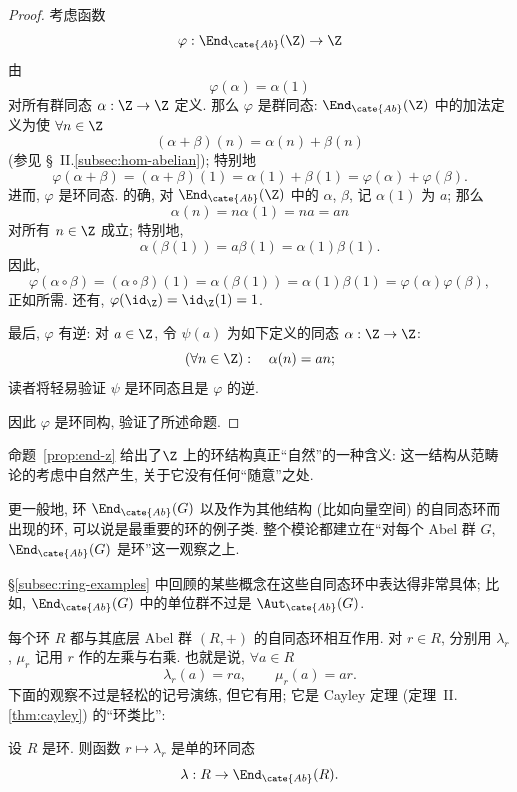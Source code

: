 \begin{proof}
考虑函数
\[
\varphi : \End_{\cate{Ab}}(\Z) \to \Z
\]
由
\[
\varphi(\alpha) = \alpha(1)
\]
对所有群同态 $\alpha : \Z \to \Z$ 定义. 那么 $\varphi$ 是群同态: $\End_{\cate{Ab}}(\Z)$ 中的加法定义为使 $\forall n \in \Z$
\[
(\alpha + \beta)(n) = \alpha(n) + \beta(n)
\]
(参见 \S~II.\ref{subsec:hom-abelian}); 特别地
\[
\varphi(\alpha + \beta) = (\alpha + \beta)(1) = \alpha(1) + \beta(1) = \varphi(\alpha) + \varphi(\beta).
\]
进而, $\varphi$ 是环同态. 的确, 对 $\End_{\cate{Ab}}(\Z)$ 中的 $\alpha$, $\beta$, 记 $\alpha(1)$ 为 $a$; 那么
\[
\alpha(n) = n\alpha(1) = na = an
\]
对所有 $n \in \Z$ 成立; 特别地,
\[
\alpha(\beta(1)) = a\beta(1) = \alpha(1)\beta(1).
\]
因此,
\[
\varphi(\alpha \circ \beta) = (\alpha \circ \beta)(1) = \alpha(\beta(1)) = \alpha(1)\beta(1) = \varphi(\alpha)\varphi(\beta),
\]
正如所需. 还有, $\varphi(\id_{\Z}) = \id_{\Z}(1) = 1$.

最后, $\varphi$ 有逆: 对 $a \in \Z$, 令 $\psi(a)$ 为如下定义的同态 $\alpha : \Z \to \Z$:
\[
(\forall n \in \Z): \quad \alpha(n) = an;
\]
读者将轻易验证 $\psi$ 是环同态且是 $\varphi$ 的逆.

因此 $\varphi$ 是环同构, 验证了所述命题.
\end{proof}

命题~\ref{prop:end-z} 给出了$\Z$ 上的环结构真正``自然''的一种含义: 这一结构从范畴论的考虑中自然产生, 关于它没有任何``随意''之处.

更一般地, 环 $\End_{\cate{Ab}}(G)$ 以及作为其他结构 (比如向量空间) 的自同态环而出现的环, 可以说是最重要的环的例子类. 整个模论都建立在``对每个 Abel 群 $G$, $\End_{\cate{Ab}}(G)$ 是环''这一观察之上.

\S\ref{subsec:ring-examples} 中回顾的某些概念在这些自同态环中表达得非常具体; 比如, $\End_{\cate{Ab}}(G)$ 中的单位群不过是 $\Aut_{\cate{Ab}}(G)$.

每个环 $R$ 都与其底层 Abel 群 $(R, +)$ 的自同态环相互作用. 对 $r \in R$, 分别用 $\lambda_r$, $\mu_r$ 记用 $r$ 作的左乘与右乘. 也就是说, $\forall a \in R$
\[
\lambda_r(a) = ra, \qquad \mu_r(a) = ar.
\]
下面的观察不过是轻松的记号演练, 但它有用; 它是 Cayley 定理 (定理~II.\ref{thm:cayley}) 的``环类比'':

\begin{proposition}
\label{prop:cayley-rings}
设 $R$ 是环. 则函数 $r \mapsto \lambda_r$ 是单的环同态
\[
\lambda : R \to \End_{\cate{Ab}}(R).
\]
\end{proposition}

